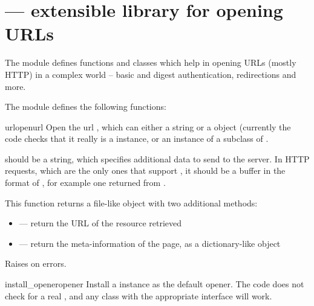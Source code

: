 \section{ ---
         extensible library for opening URLs}




The  module defines functions and classes which help
in opening URLs (mostly HTTP) in a complex world -- basic and digest
authentication, redirections and more.

The  module defines the following functions:

\begin{funcdesc}{urlopen}{url}
Open the url , which can either a string or a 
object (currently the code checks that it really is a 
instance, or an instance of a subclass of .

 should be a string, which specifies additional data to
send to the server. In HTTP requests, which are the only ones that
support , it should be a buffer in the format of
, for example one returned
from .

This function returns a file-like object with two additional methods:

\begin{itemize}

	\item {} --- return the URL of the resource retrieved
	\item {} --- return the meta-information of the page, as
                                a dictionary-like object
\end{itemize}

Raises  on errors.
\end{funcdesc}

\begin{funcdesc}{install_opener}{opener}
Install a  instance as the default opener.
The code does not check for a real , and any
class with the appropriate interface will work.
\end{funcdesc}

